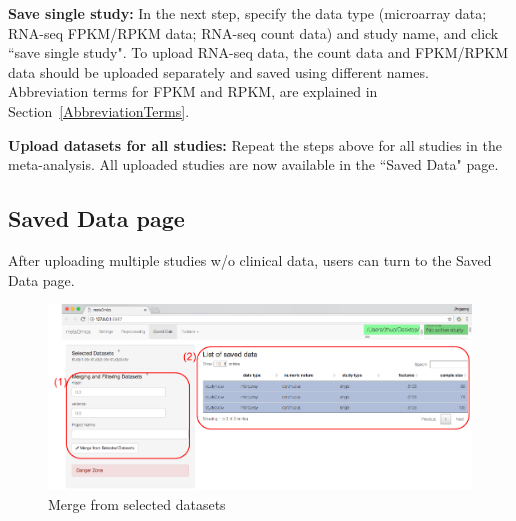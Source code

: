 \begin{steps}
\item \textbf{Save single study:}
In the next step,
specify the data type (microarray data; RNA-seq FPKM/RPKM data; RNA-seq count data) and study name,
and click ``save single study".
To upload RNA-seq data, the count data and FPKM/RPKM
 data should be uploaded separately and saved using different names.
Abbreviation terms for FPKM and RPKM, are explained in Section~\ref{AbbreviationTerms}.

\item \textbf{Upload datasets for all studies:}
Repeat the steps above for all studies in the meta-analysis.
All uploaded studies are now available in the ``Saved Data" page. 
 
\end{steps}

\subsection{Saved Data page}
\label{sec:saved}

After uploading multiple studies w/o clinical data,
users can turn to the Saved Data page.

\begin{figure}[H]
\begin{center}
\includegraphics[scale=1]{./figure/preprocessing/GUImerge.pdf}
\caption{Merge from selected datasets}
\label{fig:GUImerge}
\end{center}
\end{figure}


